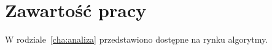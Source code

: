 
\section{Zawartość pracy}
\label{sec:zawartoscPracy}

W rodziale~\ref{cha:analiza} przedstawiono dostępne na rynku algorytmy. 


















